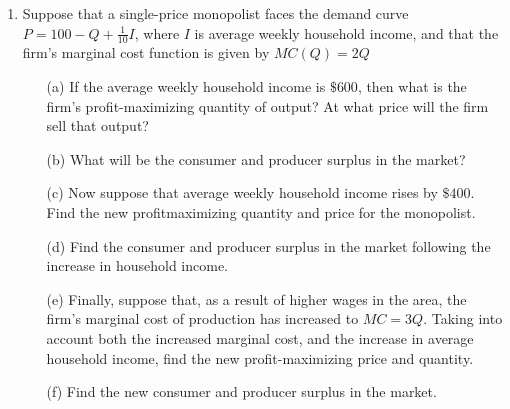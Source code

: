 \documentclass[11pt]{article}
\begin{document}
\begin{enumerate}
  \item Suppose that a single-price monopolist faces the demand curve $P = 100 - Q + \frac{1}{10} I$, where $I$ is average weekly household income, and that the firm's marginal cost function is given by $MC(Q) = 2Q$

  \begin{enumerate}
    \item[(a)] If the average weekly household income is $\$ 600$, then what is the firm's profit-maximizing quantity of output? At what price will the firm sell that output?

    \item[(b)] What will be the consumer and producer surplus in the market?

    \item[(c)] Now suppose that average weekly household income rises by $\$ 400$. Find the new profitmaximizing quantity and price for the monopolist.

    \item[(d)] Find the consumer and producer surplus in the market following the increase in household income.

    \item[(e)] Finally, suppose that, as a result of higher wages in the area, the firm's marginal cost of production has increased to $MC = 3Q$. Taking into account both the increased marginal cost, and the increase in average household income, find the new profit-maximizing price and quantity.

    \item[(f)] Find the new consumer and producer surplus in the market. 
  \end{enumerate}
\end{enumerate}
\end{document}
